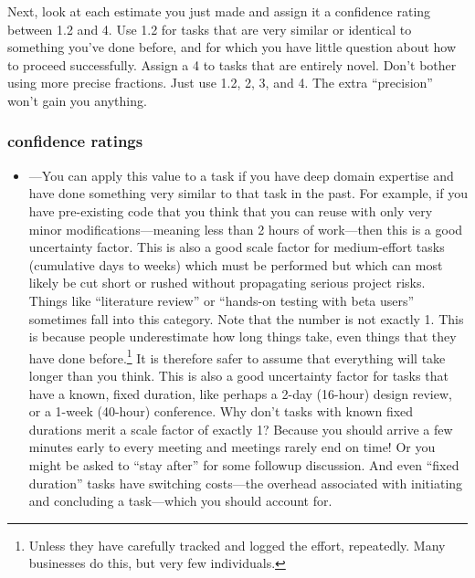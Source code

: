 \documentclass[12pt,oneside]{book}
\begin{document}
Next, look at each estimate you just made and assign it a confidence rating between 1.2 and 4. Use 1.2 for tasks that are very similar or identical to something you've done before, and for which you have little question about how to proceed successfully. Assign a 4 to tasks that are entirely novel. Don't bother using more precise fractions. Just use 1.2, 2, 3, and 4. The extra ``precision'' won't gain you anything.

\subsubsection*{confidence ratings}
\label{scrivauto:37}

\begin{itemize}[wide, labelwidth=!, labelindent=0pt, font=\bfseries]
\item[1.2]---You can apply this value to a task if you have deep domain expertise and have done something very similar to that task in the past. For example, if you have pre-existing code that you think that you can reuse with only very minor modifications---meaning less than 2 hours of work---then this is a good uncertainty factor. This is also a good scale factor for medium-effort tasks (cumulative days to weeks) which must be performed but which can most likely be cut short or rushed without propagating serious project risks. Things like ``literature review'' or ``hands-on testing with beta users'' sometimes fall into this category.
Note that the number is not exactly 1. This is because people underestimate how long things take, even things that they have done before.\footnote{
Unless they have carefully tracked and logged the effort, repeatedly. Many businesses do this, but very few individuals.}
It is therefore safer to assume that everything will take longer than you think. This is also a good uncertainty factor for tasks that have a known, fixed duration, like perhaps a 2-day (16-hour) design review, or a 1-week (40-hour) conference. Why don't tasks with known fixed durations merit a scale factor of exactly 1? Because you should arrive a few minutes early to every meeting and meetings rarely end on time! Or you might be asked to ``stay after'' for some followup discussion. And even ``fixed duration'' tasks have switching costs---the overhead associated with initiating and concluding a task---which you should account for.


\end{itemize}
\end{document}
